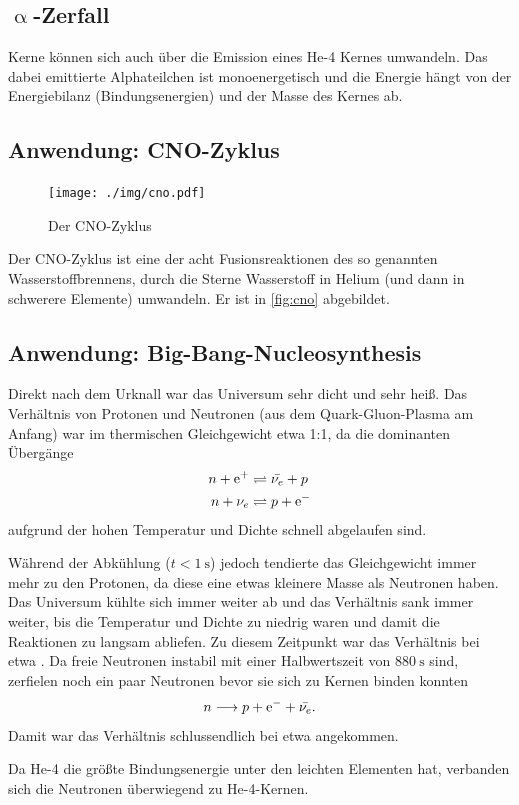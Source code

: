 \subsection{$\upalpha$-Zerfall}
Kerne können sich auch über die Emission eines He-4 Kernes umwandeln.
Das dabei emittierte Alphateilchen ist monoenergetisch und die Energie hängt von der Energiebilanz (Bindungsenergien) und der Masse des Kernes ab.

\subsection{Anwendung: CNO-Zyklus}
\begin{figure}
	\centering
	\texttt{[image: ./img/cno.pdf]}
	\caption{Der CNO-Zyklus}
	\label{fig:cno}
\end{figure}
Der CNO-Zyklus ist eine der acht Fusionsreaktionen des so genannten Wasserstoffbrennens, durch die Sterne Wasserstoff in Helium (und dann in schwerere Elemente) umwandeln.
Er ist in \autoref{fig:cno} abgebildet.

\subsection{Anwendung: Big-Bang-Nucleosynthesis}
Direkt nach dem Urknall war das Universum sehr dicht und sehr heiß.
Das Verhältnis von Protonen und Neutronen (aus dem Quark-Gluon-Plasma am Anfang) war im thermischen Gleichgewicht etwa 1:1, da die dominanten Übergänge
\begin{align*}
	n + \text{e}^+ &\rightleftharpoons \bar{\nu_e} + p \\
	n + \nu_e &\rightleftharpoons p + \text{e}^-
\end{align*}
aufgrund der hohen Temperatur und Dichte schnell abgelaufen sind.

Während der Abkühlung ($t<\SI{1}{\second}$) jedoch tendierte das Gleichgewicht immer mehr zu den Protonen, da diese eine etwas kleinere Masse als Neutronen haben.
Das Universum kühlte sich immer weiter ab und das Verhältnis  sank immer weiter, bis die Temperatur und Dichte zu niedrig waren und damit die Reaktionen zu langsam abliefen.
Zu diesem Zeitpunkt war das Verhältnis bei etwa .
Da freie Neutronen instabil mit einer Halbwertszeit von $\SI{880}{\second}$ sind, zerfielen noch ein paar Neutronen bevor sie sich zu Kernen binden konnten
\begin{equation*}
	n \longrightarrow p + \text{e}^- + \bar{\nu_e}.
\end{equation*}
Damit war das Verhältnis schlussendlich bei etwa  angekommen.

Da He-4 die größte Bindungsenergie unter den leichten Elementen hat, verbanden sich die Neutronen überwiegend zu He-4-Kernen.

